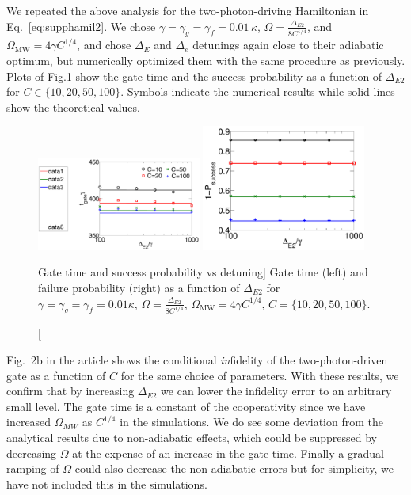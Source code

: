 We repeated the above analysis for the two-photon-driving Hamiltonian in
Eq.~\eqref{eq:supphamil2}. We chose $ \gamma = \gamma_g = \gamma_f =
0.01\,\kappa$,  $\Omega = \frac{\Delta_{E2}}{8 C^{1/4}}$, and
$\Omega_{\text{MW}} = 4\gamma C^{1/4}$, and chose $\Delta_E$ and $\Delta_e$
detunings again close to their adiabatic optimum, but numerically optimized them
with the same procedure as previously.
Plots of Fig.\ref{fig:t,P 2} show the gate time and the success probability as a
function of $\Delta_{E2}$ for $C\in\{10, 20, 50,100\}$. Symbols indicate the
numerical results while solid lines show the theoretical values.
 \begin{figure}[h]
\centering
\includegraphics[width=0.48\textwidth]{./figs_Borregaard_PRL2015/figureSN4}\quad 
\includegraphics[width=0.48\textwidth]{./figs_Borregaard_PRL2015/figureSN5}
\caption
[Gate time and success probability vs detuning]
{
\label{fig:t,P 2} 
Gate time (left) and failure probability (right) as a function of $\Delta_{E2}$
for $\gamma = \gamma_g = \gamma_f = 0.01\kappa$, $\Omega = \frac{\Delta_{E2}}{8
C^{1/4}}$, $\Omega_{\text{MW}} = 4\gamma C^{1/4}$, $C = \{10,20,50,100\}$.
	}
\end{figure} 
Fig.~2b in the article shows the conditional \emph{in}fidelity of the
two-photon-driven gate as a function of $C$ for the same choice of parameters.
With these results, we confirm that by increasing $\Delta_{E2}$ we can lower the
infidelity error to an arbitrary small level. The gate time is a constant of the
cooperativity since we have increased $\Omega_{MW}$ as $C^{1/4}$ in the
simulations. We do see some deviation from the analytical results due to
non-adiabatic effects, which could be suppressed by decreasing $\Omega$ at the
expense of an increase in the gate time. Finally a gradual ramping of $\Omega$
could also decrease the non-adiabatic errors but for simplicity, we have not
included this in the simulations.

